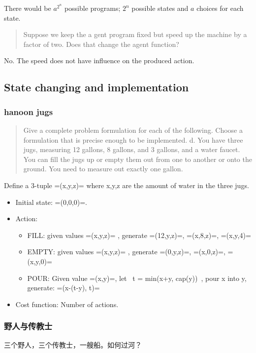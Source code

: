 There would be $a^{2^n}$ possible programs; $2^n$ possible states and
$a$ choices for each state.

\begin{quote}
  Suppose we keep the a gent program fixed but speed up the machine by
  a factor of two. Does that change the agent function?
\end{quote}

No. The speed does not have influence on the produced action.






\subsection{State changing and implementation}
\subsubsection{hanoon jugs}
\begin{quote}
  Give a complete problem formulation for each of the following.
  Choose a formulation that is precise enough to be implemented.
  d. You have three jugs, measuring 12 gallons, 8 gallons, and 3 gallons, and a water faucet.
  You can fill the jugs up or empty them out from one to another or onto the ground.
  You need to measure out exactly one gallon.
\end{quote}

Define a 3-tuple =(x,y,z)= where x,y,z are the amount of water in the
three jugs.
\begin{itemize}
\item Initial state: =(0,0,0)=.
\item Action:
  \begin{itemize}
  \item FILL: given values =(x,y,z)= , generate =(12,y,z)=, =(x,8,z)=,
    =(x,y,4)=
  \item EMPTY: given values =(x,y,z)= , generate =(0,y,z)=, =(x,0,z)=,
    =(x,y,0)=
  \item POUR: Given value =(x,y)=, let ~t = min(x+y, cap(y))~, pour x
    into y, generate: =(x-(t-y), t)=
  \end{itemize}
\item Cost function: Number of actions.
\end{itemize}

\subsubsection{野人与传教士}
三个野人，三个传教士，一艘船。如何过河？


